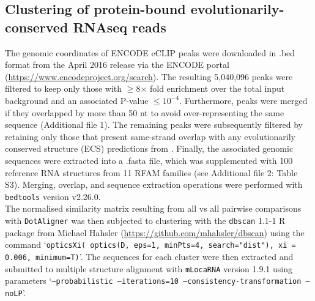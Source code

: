 \documentclass{bmcart}
\newcommand\dotaligner{\texttt{DotAligner}}
\begin{document}
\subsection*{Clustering of protein-bound evolutionarily-conserved RNAseq reads}

The genomic coordinates of ENCODE eCLIP peaks were downloaded in .bed format from the April 2016 release via the ENCODE portal (\url{https://www.encodeproject.org/search}). The resulting 5,040,096 peaks 
were filtered to keep only those with $\ge$8$\times$ fold enrichment over the total input background and an associated P-value  $\leq10^{-4}$. Furthermore, peaks were merged if they overlapped by more than 50 nt to avoid over-representing the same sequence (Additional file 1). The remaining peaks were subsequently filtered by 
retaining only those that present same-strand overlap with any evolutionarily conserved structure (ECS) predictions from \cite{smith2013widespread}. Finally, the associated genomic sequences were extracted into a .fasta file, which was supplemented with 100 reference RNA structures from 11 RFAM families (see Additional file 2: Table S3). 
Merging, overlap, and sequence extraction operations were performed with \texttt{bedtools} version v2.26.0. \\

The normalised similarity matrix resulting from all vs all pairwise comparisons with \dotaligner{} was then 
subjected to clustering with the \texttt{dbscan} 1.1-1 R package from Michael Hahsler (\url{https://github.com/mhahsler/dbscan}) using the command `\texttt{opticsXi( optics(D, eps=1, minPts=4, search="dist"), xi = 0.006, minimum=T)}'. The sequences for each cluster were then extracted and submitted to multiple structure alignment with \texttt{mLocaRNA} version 1.9.1 using parameters  `\texttt{--probabilistic --iterations=10  --consistency-transformation --noLP}'.\\
 

\end{document}
